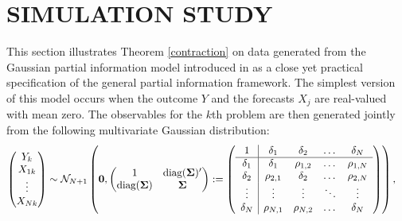 \documentclass[12pt]{article}
\theoremstyle{definition}
\theoremstyle{definition}
\def\bSigma{{\bf \Sigma}}
\def\diag{\text{diag}}
\def\diag{\text{diag}}
\begin{document}
\section{SIMULATION STUDY} \label{simulation}

This section illustrates Theorem \ref{contraction} on data generated from the Gaussian partial information model introduced in \cite{satopaamodeling2, satopaamodeling}  as a close yet practical specification of the general partial information framework.
%
 The simplest version of this model occurs when the outcome $Y$ and the forecasts $X_j$ are real-valued with mean zero. The observables for the $k$th problem are then generated jointly from the following multivariate Gaussian distribution:
\begin{align}
\left(\begin{matrix} Y_k \\ X_{1k}\\ \vdots \\ X_{Nk} \end{matrix}\right) &\sim \mathcal{N}_{N+1}\left( 
 \boldsymbol{0}, \left(\begin{matrix} 
1 & \diag(\bSigma)'\\
\diag(\bSigma) &\bSigma\\
 \end{matrix}\right) 
 :=
 \left(\begin{array}{c | c c cc }
1 & \delta_1 & \delta_2 & \dots & \delta_N  \\ \hline
\delta_1 & \delta_1 &\rho_{1,2} & \dots & \rho_{1,N}   \\ 
\delta_2 & \rho_{2,1} & \delta_2 & \dots & \rho_{2,N}  \\ 
\vdots & \vdots & \vdots & \ddots & \vdots  \\ 
\delta_N & \rho_{N,1} & \rho_{N,2} & \dots & \delta_N\\ 
 \end{array}\right)\right),  \label{NExperts}
\end{align}
\end{document}
